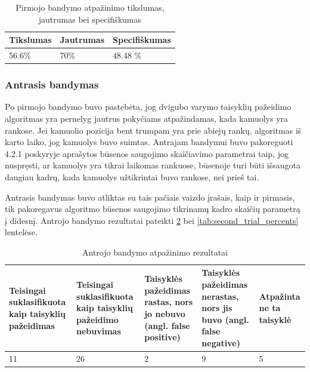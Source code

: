 \documentclass{VUMIFPSbakalaurinis}
\begin{document}
 \begin{table}[H]\footnotesize
	\centering
	\caption{Pirmojo bandymo atpažinimo tikslumas, jautrumas bei specifiškumas}
	{\begin{tabular}{|p{5cm}|p{5cm}|p{5cm}|} \hline
			\textbf{Tikslumas} & \textbf{Jautrumas} & \textbf{Specifiškumas} \\
			\hline
			56.6\%  & 70\%    & 48.48 \%    \\
			
			\hline
	\end{tabular}}
	\label{tab:first_trial_percents}
\end{table}

\subsubsection{Antrasis bandymas}

Po pirmojo bandymo buvo pastebėta, jog dvigubo varymo taisyklių pažeidimo algoritmas yra pernelyg jautrus pokyčiams atpažindamas, kada kamuolys yra rankose. Jei kamuolio pozicija bent trumpam yra prie abiejų rankų, algoritmas iš karto laiko, jog kamuolys buvo suimtas. Antrajam bandymui buvo pakoreguoti 4.2.1 poskyryje aprašytos būsenos saugojimo skaičiavimo parametrai taip, jog nuspręsti, ar kamuolys yra tikrai laikomas rankuose, būsenoje turi būti išsaugota daugiau kadrų, kada kamuolys užtikrintai buvo rankose, nei prieš tai.

Antrasis bandymas buvo atliktas su tais pačiais vaizdo įrašais, kaip ir pirmasis, tik pakoregavus algoritmo būsenos saugojimo tikrinamų kadro skaičių parametrą į didesnį. Antrojo bandymo rezultatai pateikti  \ref{tab:second_trial} bei \ref{tab:second_trial_percents} lentelėse.

\begin{table}[H]\footnotesize
	\centering
	\caption{Antrojo bandymo atpažinimo rezultatai}
	{\begin{tabular}{|p{3cm}|p{3cm}|p{3cm}|p{3cm}|p{2cm}|} \hline
			\textbf{Teisingai suklasifikuota kaip taisyklių pažeidimas} & \textbf{Teisingai suklasifikuota kaip taisyklių pažeidimo nebuvimas} & \textbf{Taisyklės pažeidimas rastas, nors jo nebuvo (angl. false positive)} & \textbf{Taisyklės pažeidimas nerastas, nors jis buvo (angl. false negative)} & \textbf{Atpažinta ne ta taisyklė} \\
			\hline
			11  & 26    & 2    & 9    & 5   \\
			\hline
	\end{tabular}}
	\label{tab:second_trial}
\end{table}
\end{document}
